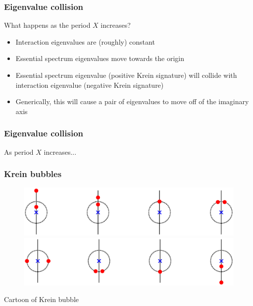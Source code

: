 \documentclass[16pt]{beamer}
\begin{document}
\begin{frame}
	\frametitle{Eigenvalue collision}
	\large
	What happens as the period $X$ increases?
	\begin{itemize}
		\item Interaction eigenvalues are (roughly) constant
		\vspace{0.5cm}
		\item Essential spectrum eigenvalues move towards the origin
		\vspace{0.5cm}
		\item Essential spectrum eigenvalue (positive Krein signature) will collide with interaction eigenvalue (negative Krein signature)
		\vspace{0.5cm}
		\item Generically, this will cause a pair of eigenvalues to move off of the imaginary axis
	\end{itemize}
\end{frame}

\begin{frame}
	\frametitle{Eigenvalue collision}
	As period $X$ increases...
	\begin{center}
	\end{center}
\end{frame}


\begin{frame}
	\frametitle{Krein bubbles}
		\begin{figure}
		\begin{center}
		\includegraphics[width=12cm]{images/KreinBubbleTop.eps} \\
	\includegraphics[width=12cm]{images/KreinBubbleBottom.eps}
		\end{center}
		\end{figure}
		\begin{center}
		Cartoon of Krein bubble
		\end{center}
\end{frame}
\end{document}
